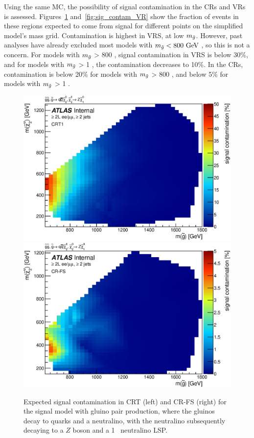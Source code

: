 Using the same \ac{MC}, the possibility of signal contamination in the \acp{CR} and \acp{VR} is assessed. Figures~\ref{fig:sig_contam_CRT} and~\ref{fig:sig_contam_VR} show the fraction of events in these regions expected to come from signal for different points on the simplified model's mass grid. Contamination is highest in VRS, at low $m_{\tilde g}$. However, past analyses have already excluded most models with $m_\go < 800 \gev$ \cite{SUSY-2014-10}, so this is not a concern. For models with $m_{\tilde g}$ > 800 \gev, signal contamination in VRS is below 30\%, and for models with $m_{\tilde g}$ > 1 \tev, the contamination decreases to 10\%. In the \acp{CR}, contamination is below 20\% for models with $m_{\tilde g}$ > 800 \gev, and below 5\% for models with $m_{\tilde g}$ > 1 \tev. 

\begin{figure}[ht]
\centering
\includegraphics[width=.48\textwidth]{figures/signalacceptcontam/cont_SM_GG_N2_1_CRT1.eps}
\includegraphics[width=.48\textwidth]{figures/signalacceptcontam/cont_SM_GG_N2_1_CR-FS.eps}
\caption{
Expected signal contamination in CRT (left) and CR-FS (right) for the signal model with gluino pair production, where the gluinos decay to quarks and a neutralino, 
with the neutralino subsequently decaying to a $Z$ boson and a 1 \gev~neutralino LSP.}
\label{fig:sig_contam_CRT}
\end{figure}

